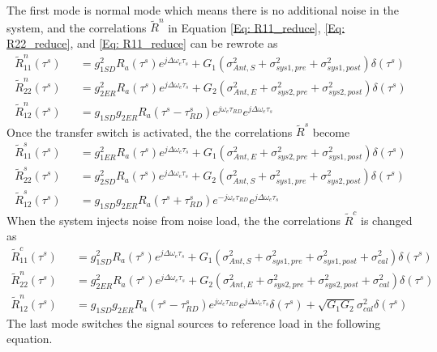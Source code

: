 \documentclass[draftcls,onecolumn]{IEEEtran}  %
\begin{document}
The first mode is normal mode which means there is no additional noise in the system, and the correlations $\tilde{R}^n$ in Equation \ref{Eq: R11_reduce}, \ref{Eq: R22_reduce}, and \ref{Eq: R11_reduce} can be rewrote as
\begin{eqnarray}
	\tilde{R}_{11}^n(\tau^s) &&= g^2_{1SD} R_a(\tau^s)e^{j\Delta\omega_e\tau_s}+
G_1(\sigma^2_{Ant,S}+\sigma^2_{sys1,pre} +\sigma^2_{sys1,post}) \delta(\tau^s)                                      
\label{Eq: R11_reduce_norm} \\
	\tilde{R}_{22}^n(\tau^s) &&= g^2_{2ER} R_a(\tau^s)e^{j\Delta\omega_e\tau_s}+
G_2(\sigma^2_{Ant,E}+\sigma^2_{sys2,pre} +\sigma^2_{sys2,post}) \delta(\tau^s)                                       
\label{Eq: R22_reduce_norm} \\
	\tilde{R}_{12}^n(\tau^s) &&= g_{1SD} g_{2ER} R_a(\tau^s-\tau^s_{RD})e^{j\omega_e \tau_{RD}} e^{j\Delta\omega_e\tau_s}  
\label{Eq: R12_reduce_norm}
\end{eqnarray}
Once the transfer switch is activated, the the correlations $\tilde{R}^s$ become
\begin{eqnarray}
\tilde{R}_{11}^s(\tau^s) &&= g^2_{1ER} R_a(\tau^s)e^{j\Delta\omega_e\tau_s}+
G_1(\sigma^2_{Ant,E}+\sigma^2_{sys2,pre} +\sigma^2_{sys1,post}) \delta(\tau^s)                                       
\label{Eq: R22_reduce_swap} \\
\tilde{R}_{22}^s(\tau^s) &&= g^2_{2SD} R_a(\tau^s)e^{j\Delta\omega_e\tau_s}+
G_2(\sigma^2_{Ant,S}+\sigma^2_{sys1,pre} +\sigma^2_{sys2,post}) \delta(\tau^s)                                      
\label{Eq: R11_reduce_swap} \\
	\tilde{R}_{12}^s(\tau^s) &&= g_{1SD} g_{2ER} R_a(\tau^s+\tau^s_{RD})e^{-j\omega_e \tau_{RD}} e^{j\Delta\omega_e\tau_s}  
\label{Eq: R12_reduce_swap}
\end{eqnarray}
When the system injects noise from noise load, the the correlations $\tilde{R}^c$ is changed as
\begin{eqnarray}
	\tilde{R}_{11}^c(\tau^s) &&= g^2_{1SD} R_a(\tau^s)e^{j\Delta\omega_e\tau_s}+
G_1(\sigma^2_{Ant,S}+\sigma^2_{sys1,pre} +\sigma^2_{sys1,post}+\sigma^2_{cal}) \delta(\tau^s)                                      
\label{Eq: R11_reduce_cal} \\
	\tilde{R}_{22}^n(\tau^s) &&= g^2_{2ER} R_a(\tau^s)e^{j\Delta\omega_e\tau_s}+
G_2(\sigma^2_{Ant,E}+\sigma^2_{sys2,pre} +\sigma^2_{sys2,post}+\sigma^2_{cal}) \delta(\tau^s)                                       
\label{Eq: R22_reduce_cal} \\
	\tilde{R}_{12}^n(\tau^s) &&= g_{1SD} g_{2ER} R_a(\tau^s-\tau^s_{RD})e^{j\omega_e \tau_{RD}} e^{j\Delta\omega_e\tau_s}\delta(\tau^s)+
    \sqrt{G_1 G_2}\sigma^2_{cal}\delta(\tau^s)  
\label{Eq: R12_reduce_cal}
\end{eqnarray}The last mode switches the signal sources to reference load in the following equation.
\end{document}
